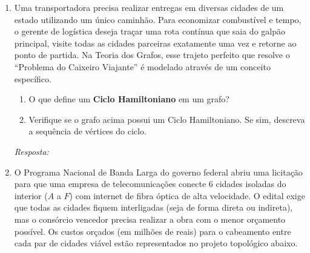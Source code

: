 \documentclass[12pt]{article}
\newcommand{\quadro}[1]{\vspace{0.2cm}\begin{tcolorbox}[colback=white, colframe=black, height=#1, boxrule=0.5pt, arc=0pt] \textit{Resposta:} \end{tcolorbox}}
\begin{document}
\begin{enumerate}[label=\arabic*), leftmargin=1.5cm, itemsep=0.8cm]
\item Uma transportadora precisa realizar entregas em diversas cidades de um estado utilizando um único caminhão. Para economizar combustível e tempo, o gerente de logística deseja traçar uma rota contínua que saia do galpão principal, visite todas as cidades parceiras exatamente uma vez e retorne ao ponto de partida. Na Teoria dos Grafos, esse trajeto perfeito que resolve o ``Problema do Caixeiro Viajante'' é modelado através de um conceito específico.
\begin{center}
\end{center}
\begin{enumerate}[label=\alph*)]
    \item O que define um \textbf{Ciclo Hamiltoniano} em um grafo?
    \item Verifique se o grafo acima possui um Ciclo Hamiltoniano. Se sim, descreva a sequência de vértices do ciclo.
\end{enumerate}
\quadro{5cm}

\item O Programa Nacional de Banda Larga do governo federal abriu uma licitação para que uma empresa de telecomunicações conecte 6 cidades isoladas do interior ($A$ a $F$) com internet de fibra óptica de alta velocidade. O edital exige que todas as cidades fiquem interligadas (seja de forma direta ou indireta), mas o consórcio vencedor precisa realizar a obra com o menor orçamento possível. Os custos orçados (em milhões de reais) para o cabeamento entre cada par de cidades viável estão representados no projeto topológico abaixo.


\end{enumerate}
\end{document}

